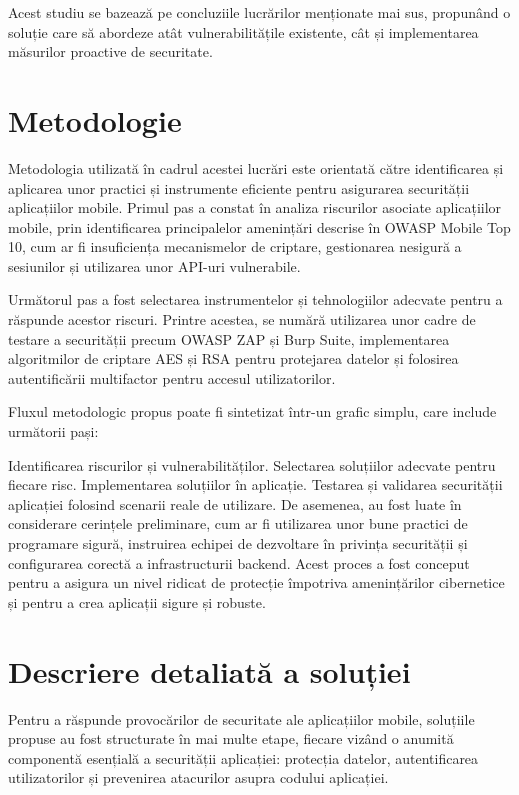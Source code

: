 \documentclass[runningheads]{llncs}
\begin{document}
Acest studiu se bazează pe concluziile lucrărilor menționate mai sus, propunând o soluție care să abordeze atât vulnerabilitățile existente, cât și implementarea măsurilor proactive de securitate.

\section{Metodologie}
Metodologia utilizată în cadrul acestei lucrări este orientată către identificarea și aplicarea unor practici și instrumente eficiente pentru asigurarea securității aplicațiilor mobile. Primul pas a constat în analiza riscurilor asociate aplicațiilor mobile, prin identificarea principalelor amenințări descrise în OWASP Mobile Top 10, cum ar fi insuficiența mecanismelor de criptare, gestionarea nesigură a sesiunilor și utilizarea unor API-uri vulnerabile.

Următorul pas a fost selectarea instrumentelor și tehnologiilor adecvate pentru a răspunde acestor riscuri. Printre acestea, se numără utilizarea unor cadre de testare a securității precum OWASP ZAP și Burp Suite, implementarea algoritmilor de criptare AES și RSA pentru protejarea datelor și folosirea autentificării multifactor pentru accesul utilizatorilor.

Fluxul metodologic propus poate fi sintetizat într-un grafic simplu, care include următorii pași:

Identificarea riscurilor și vulnerabilităților.
Selectarea soluțiilor adecvate pentru fiecare risc.
Implementarea soluțiilor în aplicație.
Testarea și validarea securității aplicației folosind scenarii reale de utilizare.
De asemenea, au fost luate în considerare cerințele preliminare, cum ar fi utilizarea unor bune practici de programare sigură, instruirea echipei de dezvoltare în privința securității și configurarea corectă a infrastructurii backend. Acest proces a fost conceput pentru a asigura un nivel ridicat de protecție împotriva amenințărilor cibernetice și pentru a crea aplicații sigure și robuste.

\section{Descriere detaliată a soluției}
Pentru a răspunde provocărilor de securitate ale aplicațiilor mobile, soluțiile propuse au fost structurate în mai multe etape, fiecare vizând o anumită componentă esențială a securității aplicației: protecția datelor, autentificarea utilizatorilor și prevenirea atacurilor asupra codului aplicației.
\end{document}
